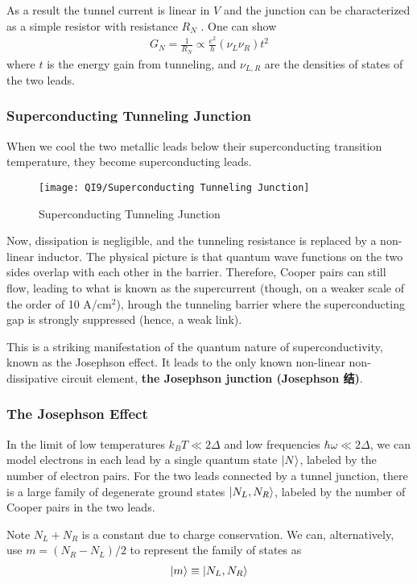 As a result the tunnel current is linear in $V$ and the junction can be characterized as a simple resistor with resistance $R_N$ . One can show
\begin{align*}
    G_N=\frac{1}{R_N} \propto \frac{e^2}{h}(\nu_L \nu_R)t^2
\end{align*}
where $t$ is the energy gain from tunneling, and $\nu_{L,R}$ are the densities of states of the two leads.

\subsubsection{Superconducting Tunneling Junction}
When we cool the two metallic leads below their superconducting transition temperature, they become superconducting leads.

\begin{figure}[H]
    \centering
    \texttt{[image: QI9/Superconducting Tunneling Junction]}
    \caption{Superconducting Tunneling Junction}
\end{figure}
Now, dissipation is negligible, and the tunneling resistance is replaced by a non-linear inductor. The physical picture is that quantum wave functions on the two sides overlap with each other in the barrier. Therefore, Cooper pairs can still flow, leading to what is known as the supercurrent (though, on a weaker scale of the order of 10 A/cm${}^2$), hrough the tunneling barrier where the superconducting gap is strongly suppressed (hence, a weak link).

This is a striking manifestation of the quantum nature of superconductivity, known as the Josephson effect. It leads to the only known non-linear non-dissipative circuit element, \textbf{the Josephson junction (Josephson 结)}.

\subsubsection{The Josephson Effect}

In the limit of low temperatures $k_B T\ll 2\Delta$ and low frequencies $\hbar \omega \ll 2\Delta$, we can model electrons in each lead by a single quantum state $\ket{N}$, labeled by the number of electron pairs. For the two leads connected by a tunnel junction, there is a large family of degenerate ground states $\ket{N_L, N_R}$, labeled by the number of Cooper pairs in the two leads.

Note $N_L + N_R$ is a constant due to charge conservation. We can, alternatively, use $m = (N_R - N_L)/2$ to represent the family of states as
\begin{align*}
    \ket{m}\equiv \ket{N_L, N_R}
\end{align*}


